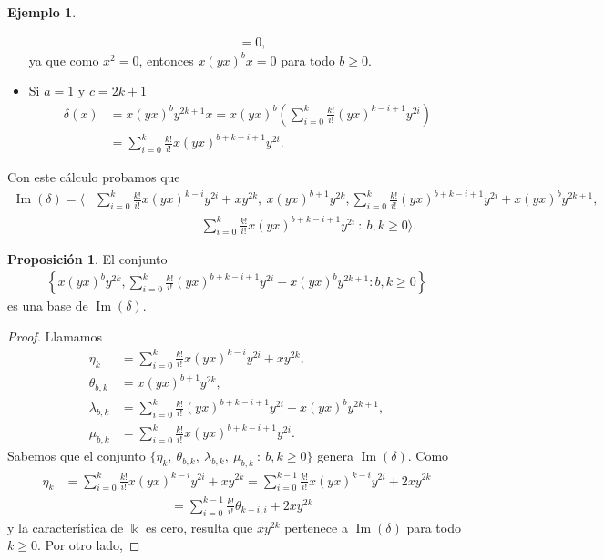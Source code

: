 \documentclass[a4paper,oneside,fleqn,11pt]{report}
\newcommand\field{\Bbbk}
\theoremstyle{definition}
\theoremstyle{definition}
\newtheorem{example}{Ejemplo}[section]
\newtheorem{prop}{Proposición}
\numberwithin{prop}{subsection}
\DeclareMathOperator\Ima{Im}
\begin{document}
\begin{example}
\begin{itemize}
\begin{align*}
		& = 0,
	\end{align*}
	ya que como $x^2 = 0$, entonces $x(yx)^bx = 0$ para todo $b \geq 0$.
\item Si $a = 1$ y $c = 2k + 1$
	\begin{align*}
		\delta(x) &= x(yx)^by^{2k + 1}x = x(yx)^b\left( \sum_{i = 0}^k\frac{k!}{i!}(yx)^{k - i + 1}y^{2i}\right) \\
		&= \sum_{i = 0}^k\frac{k!}{i!}x(yx)^{b + k - i + 1}y^{2i}.
	\end{align*}
\end{itemize}
Con este cálculo probamos que
\begin{align*}
	\Ima(\delta) = \Bigg\langle &\sum_{i = 0}^k\frac{k!}{i!}x(yx)^{k - i}y^{2i} + xy^{2k},\ x(yx)^{b + 1}y^{2k},
		 \sum_{i = 0}^k\frac{k!}{i!}(yx)^{b + k - i + 1}y^{2i} + x(yx)^by^{2k + 1}, \\
		&\hspace{100pt}\sum_{i = 0}^k\frac{k!}{i!}x(yx)^{b + k - i + 1}y^{2i}\ :\ b,k \geq 0	\Bigg\rangle.
\end{align*}
\begin{prop}
\label{imdelta}
El conjunto
\begin{align*}
		\left\{ x(yx)^by^{2k},
			\sum_{i = 0}^k\frac{k!}{i!}(yx)^{b + k - i + 1}y^{2i} + x(yx)^by^{2k + 1} :b, k \geq 0 \right\}
\end{align*}
es una base de $\Ima(\delta)$.
\end{prop}
\begin{proof}
Llamamos
\begin{align*}
	\eta_k &=  \sum_{i = 0}^k\frac{k!}{i!}x(yx)^{k - i}y^{2i} + xy^{2k}, \\
	\theta_{b,k} &= x(yx)^{b + 1}y^{2k},\\
	\lambda_{b,k} &= \sum_{i = 0}^k\frac{k!}{i!}(yx)^{b + k - i + 1}y^{2i} + x(yx)^by^{2k + 1}, \\
	\mu_{b,k} &= \sum_{i = 0}^k\frac{k!}{i!}x(yx)^{b + k - i + 1}y^{2i}.
\end{align*}
Sabemos que el conjunto $\{\eta_k,\ \theta_{b,k},\ \lambda_{b,k},\ \mu_{b,k}\ :\ b,k \geq 0\}$ genera $\Ima(\delta)$.
Como
\begin{align*}
	\eta_k &= \sum_{i = 0}^{k}\frac{k!}{i!}x(yx)^{k - i}y^{2i} + xy^{2k}
		= \sum_{i = 0}^{k-1}\frac{k!}{i!}x(yx)^{k - i}y^{2i} + 2xy^{2k} \\
	&\hspace{100pt}= \sum_{i = 0}^{k -1}\frac{k!}{i!}\theta_{k - i, i} + 2xy^{2k}
\end{align*}
y la característica de $\field$ es cero, resulta que $xy^{2k}$ pertenece a $\Ima(\delta)$ para todo $k \geq 0$. Por otro lado,

\end{proof}
\end{example}
\end{document}
